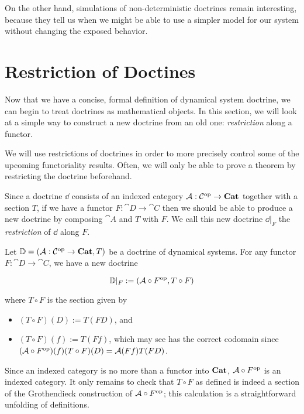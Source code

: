 \documentclass[DynamicalBook]{subfiles}
\begin{document}
On the other hand, simulations of non-deterministic doctrines remain
interesting, because they tell us when we might be able to use a simpler model
for our system without changing the exposed behavior.


\section{Restriction of Doctines}

Now that we have a concise, formal definition of dynamical system doctrine, we
can begin to treat doctrines as mathematical objects. In this section, we will
look at a simple way to construct a new doctrine from an old one:
\emph{restriction} along a functor. 

We will use restrictions of doctrines in
order to more precisely control some of the upcoming functoriality results.
Often, we will only be able to prove a theorem by restricting the doctrine beforehand.


Since a doctrine $\dd$ consists of an indexed category $\mathcal{A} : \mathcal{C}^{\textnormal{op}} \to
\textbf{Cat}$ together with a section $T$, if we have a functor $F : \cat{D} \to
\cat{C}$ then we should be able to produce a new doctrine by composing $\cat{A}$
and $T$ with $F$. We call this new doctrine $\dd|_F$ the \emph{restriction} of
$\dd$ along $F$.

\begin{definition}
Let $\mathbb{D} = (\mathcal{A} : \mathcal{C}^{\textnormal{op}} \to \textbf{Cat}, T)$ be a doctrine of dynamical
systems. For any functor $F : \cat{D} \to \cat{C}$, we have a new doctrine

$$\mathbb{D}|_F := (\mathcal{A} \circ F^{\textnormal{op}}, T \circ F)$$

where $T \circ F$ is the section given by
\begin{itemize}
  \item $(T \circ F)(D) := T(FD)$, and
  \item $(T \circ F)(f) := T(Ff)$, which may see has the correct codomain since
    $(\mathcal{A} \circ F^{\textnormal{op}})(f)(T \circ F)(D) = \mathcal{A}(Ff)T(FD)$.
\end{itemize}
\end{definition}

Since an indexed category is no more than a functor into $\textbf{Cat}$, $\mathcal{A}
\circ F^{\textnormal{op}}$ is an indexed category. It only remains to check that $T \circ F$ as
defined is indeed a section of the Grothendieck construction of $\mathcal{A} \circ
F^{\textnormal{op}}$; this calculation is a straightforward unfolding of definitions.
\end{document}
